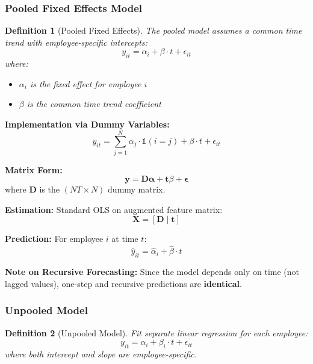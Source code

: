 \documentclass[12pt,a4paper]{article}
\newtheorem{definition}{Definition}[section]
\begin{document}
\subsubsection{Pooled Fixed Effects Model}

\begin{definition}[Pooled Fixed Effects]
The pooled model assumes a common time trend with employee-specific intercepts:
\begin{equation}
y_{it} = \alpha_i + \beta \cdot t + \epsilon_{it}
\end{equation}
where:
\begin{itemize}
    \item $\alpha_i$ is the fixed effect for employee $i$
    \item $\beta$ is the common time trend coefficient
\end{itemize}
\end{definition}

\textbf{Implementation via Dummy Variables:}
\begin{equation}
y_{it} = \sum_{j=1}^{N}\alpha_j \cdot \mathbb{1}(i=j) + \beta \cdot t + \epsilon_{it}
\end{equation}

\textbf{Matrix Form:}
\begin{equation}
\mathbf{y} = \mathbf{D}\boldsymbol{\alpha} + \mathbf{t}\beta + \boldsymbol{\epsilon}
\end{equation}
where $\mathbf{D}$ is the $(NT \times N)$ dummy matrix.

\textbf{Estimation:}
Standard OLS on augmented feature matrix:
\begin{equation}
\mathbf{X} = [\mathbf{D} \mid \mathbf{t}]
\end{equation}

\textbf{Prediction:}
For employee $i$ at time $t$:
\begin{equation}
\hat{y}_{it} = \hat{\alpha}_i + \hat{\beta} \cdot t
\end{equation}

\textbf{Note on Recursive Forecasting:}
Since the model depends only on time (not lagged values), one-step and recursive predictions are \textbf{identical}.

\subsubsection{Unpooled Model}

\begin{definition}[Unpooled Model]
Fit separate linear regression for each employee:
\begin{equation}
y_{it} = \alpha_i + \beta_i \cdot t + \epsilon_{it}
\end{equation}
where both intercept and slope are employee-specific.
\end{definition}
\end{document}
